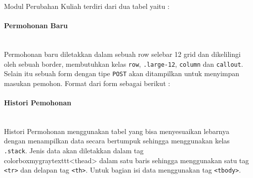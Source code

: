 \documentclass[a4paper,twoside]{article}
\newcommand{\myparagraph}[1]{\paragraph{#1}\mbox{}\\}
\begin{document}
\begin{enumerate}
		Modul Perubahan Kuliah terdiri dari dua tabel yaitu :
		
		\myparagraph{Permohonan Baru}
		Permohonan baru diletakkan dalam sebuah row selebar 12 grid dan dikelilingi oleh sebuah border, membutuhkan kelas \colorbox{mygray}{\texttt{row}}, \colorbox{mygray}{\texttt{.large-12}}, \colorbox{mygray}{\texttt{column}} dan \texttt{callout}. Selain itu sebuah form dengan tipe \texttt{POST} akan ditampilkan untuk menyimpan masukan pemohon. Format dari form sebagai berikut :
		
		\myparagraph{Histori Pemohonan}
		Histori Permohonan menggunakan tabel yang bisa menyesuaikan lebarnya dengan menampilkan data secara bertumpuk sehingga menggunakan kelas \colorbox{mygray}{\texttt{.stack}}. Jenis data akan diletakkan dalam tag \\colorbox{mygray}{texttt{<thead>}} dalam satu baris sehingga menggunakan satu tag \colorbox{mygray}{\texttt{<tr>}} dan delapan tag \colorbox{mygray}{\texttt{<th>}}. Untuk bagian isi data menggunakan tag \colorbox{mygray}{\texttt{<tbody>}}.
		

\end{enumerate}
\end{document}
